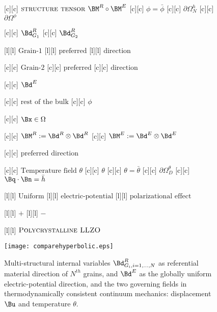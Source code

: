 \begin{figure}[ht]
	[c] {$\textsc{structure tensor } \BM^{R} \circ \BM^{E}$}
	[c] {$\phi=\bar{\phi}$}
	[c] {$\partial\Omega^{h}_{N}$}
	[c] {$\partial\Omega^{\phi}$}

	[c] {$\Bd^{R}_{G_1}$}
	[c] {$\Bd^{R}_{G_2}$}

	[l] {$\text{Grain-1}$}
	[l] {$\text{preferred}$}
	[l] {$\text{direction}$}

	[c] {$\text{Grain-2}$}
	[c] {$\text{preferred}$}
	[c] {$\text{direction}$}

	[c] {$\Bd^{E}$}

	[c] {$\text{rest of the bulk}$}
	[c] {$\phi$}

	[c] {$\Bx \in \Omega$}

	[c] {$\BM^{R} := \Bd^{R} \otimes \Bd^{R}$}
	[c] {$\BM^{E} := \Bd^{E} \otimes \Bd^{E}$}

	[c] {$\text{preferred direction}$}

	[c] {$\text{Temperature field }  \theta$}
	[c] {$\theta$}
	[c] {$\theta = \bar{\theta}$}
	[c] {$\partial\Omega^{\theta}_{D}$}
	[c] {$\Bq\cdot\Bn = \bar{h}$}

	[l] {$\text{Uniform}$}
	[l] {$\text{electric-potential}$}
	[l] {$\text{polarizational effect}$}

	[l] {$+$}
	[l] {$-$}

	[l] {$\textsc{Polycrystalline LLZO}$}

	\texttt{[image: comparehyperbolic.eps]}
	\caption{Multi-structural internal variables $\Bd^{R}_{G_{i},i=1,\dots,N}$
	as referential material direction of $N^{th}$ grains, 
	and $\Bd^{E}$ as the globally uniform electric-potential direction,
	and the two governing fields in thermodynamically consistent continuum mechanics: 
	displacement $\Bu$ and temperature $\theta$.}
	\label{\LABEL}
\end{figure}
